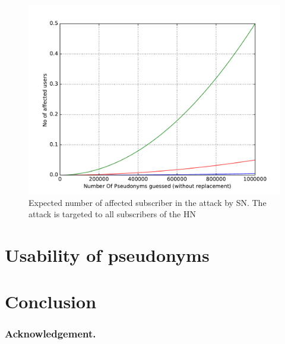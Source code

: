 \documentclass{llncs} %
\begin{document}
\begin{figure}[]
  \centering
    \includegraphics[width=\textwidth]{sn_attack_all.pdf}
  \caption{Expected number of affected subscriber in the attack by SN. The attack is targeted to all subscribers of the HN}
  \label{fig:expected_success_rate_attack_all_by_sn}	
\end{figure}


\section{Usability of pseudonyms}



\section{Conclusion}
\label{sec:conclusion}


\subsubsection{Acknowledgement.}
\label{sec:acknowledgement}



{}

\begin{thebibliography}{5}



\end{thebibliography}
\end{document}
